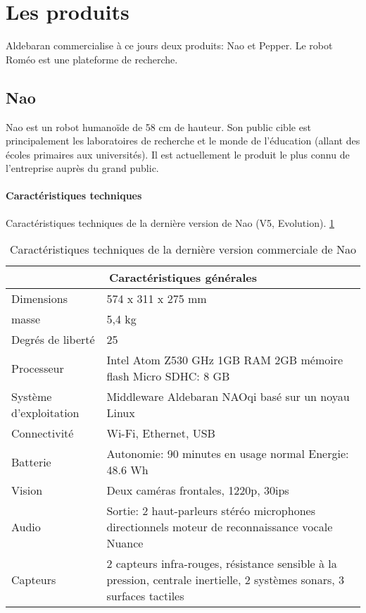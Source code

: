 \section{Les produits}
\label{Entreprise: Les produits}
Aldebaran commercialise à ce jours deux produits: Nao et Pepper. Le robot Roméo est une plateforme de recherche. 

\subsection{Nao}
\label{Entreprise: Les produits: Nao}
Nao est un robot humanoïde de 58 cm de hauteur. Son public cible est principalement les laboratoires de recherche et le monde de l'éducation (allant des écoles primaires aux universités). Il est actuellement le produit le plus connu de l'entreprise auprès du grand public. 

\paragraph{Caractéristiques techniques}
\label{Entreprise:Les produits: Nao: Caractéristiques techniques}
Caractéristiques techniques de la dernière version de Nao (V5, Evolution). \ref{tab: Caractéristiques technique de Nao}

\begin{table}[h]
\begin{tabular}{ | l | p{8cm} | }
\hline
\multicolumn{2}{|c|}{Caractéristiques générales} \\
\hline
Dimensions & 574 x 311 x 275 mm \\
\hline 
masse & 5,4 kg \\
\hline 
Degrés de liberté  & 25 \\
\hline
Processeur & Intel Atom Z530 \newline 1.6 GHz \newline 1GB RAM \newline 2GB mémoire flash \newline Micro SDHC: 8 GB \\
\hline
Système d'exploitation & Middleware Aldebaran NAOqi basé sur un noyau Linux \\
\hline
Connectivité & Wi-Fi, Ethernet, USB \\
\hline
Batterie & Autonomie: 90 minutes en usage normal \newline Energie: 48.6 Wh \\
\hline 
Vision & Deux caméras frontales, 1220p, 30ips \\
\hline
Audio & Sortie: 2 haut-parleurs stéréo \newline 4 microphones directionnels \newline moteur de reconnaissance vocale Nuance  \\
\hline
Capteurs & 2 capteurs infra-rouges, résistance sensible à la pression, centrale inertielle, 2 systèmes sonars, 3 surfaces tactiles \\
\hline
\end{tabular}
\caption[Caractéristiques technique de Nao]{Caractéristiques techniques de la dernière version commerciale  de Nao}
\label {tab: Caractéristiques technique de Nao}
\end{table}

